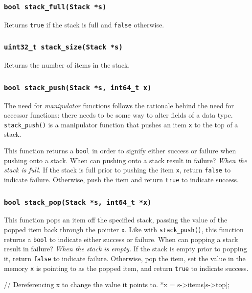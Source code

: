 \documentclass[11pt]{article}
\begin{document}
\subsubsection{\texttt{bool stack\_full(Stack *s)}}

Returns \texttt{true} if the stack is full and \texttt{false} otherwise.

\subsubsection{\texttt{uint32\_t stack\_size(Stack *s)}}

Returns the number of items in the stack.

\subsubsection{\texttt{bool stack\_push(Stack *s, int64\_t x)}}

The need for \emph{manipulator} functions follows the rationale behind
the need for accessor functions: there needs to be some way to alter
fields of a data type. \texttt{stack\_push()} is a manipulator function
that pushes an item \texttt{x} to the top of a stack.

This function returns a \texttt{bool} in order to signify either success
or failure when pushing onto a stack. When can pushing onto a stack result
in failure? \emph{When the stack is full.} If the stack is full prior to
pushing the item \texttt{x}, return \texttt{false} to indicate failure.
Otherwise, push the item and return \texttt{true} to indicate success.

\subsubsection{\texttt{bool stack\_pop(Stack *s, int64\_t *x)}}

This function pops an item off the specified stack, passing the value
of the popped item back through the pointer \texttt{x}. Like with
\texttt{stack\_push()}, this function returns a \texttt{bool} to
indicate either success or failure. When can popping a stack result in
failure? \emph{When the stack is empty.} If the stack is empty prior to
popping it, return \texttt{false} to indicate failure. Otherwise, pop
the item, set the value in the memory \texttt{x} is pointing to as the
popped item, and return \texttt{true} to indicate success.

\begin{codelisting}{}
// Dereferencing x to change the value it points to.
*x = s->items[s->top];
\end{codelisting}
\end{document}
